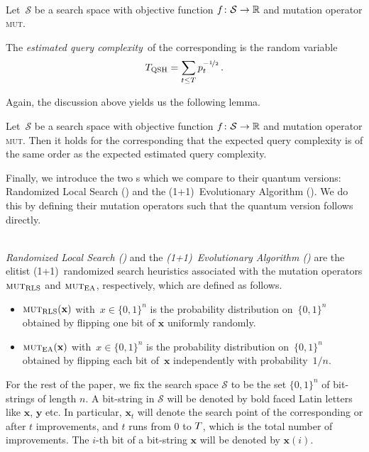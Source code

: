 \begin{definition}[$\TQSH$]~\\
Let~$\mathcal{S}$ be a search space with objective function $f\colon \mathcal{S}\to\mathbb{R}$ and mutation operator \textsc{mut}.

The \emph{estimated query complexity}~\TQSH of the corresponding \qrsh is the random variable
\[
T_{\mathrm{QSH}}=\sum_{t\le T}p_t^{-\nicefrac{1}{2}}\,.
\]
\end{definition}

Again, the discussion above yields us the following lemma.

\begin{lemma}
\label{lem:tq}
Let~$\mathcal{S}$ be a search space with objective function $f\colon \mathcal{S}\to\mathbb{R}$ and mutation operator \textsc{mut}. Then it holds for the corresponding \qrsh that the expected query complexity is of the same order as the expected estimated query complexity.
\end{lemma}

Finally, we introduce the two \rsh{}s which we compare to their quantum versions: Randomized Local Search (\rls) and the (1+1)~Evolutionary Algorithm (\ea). We do this by defining their mutation operators such that the quantum version follows directly.

\begin{definition}~\\
\emph{Randomized Local Search (\rls)} and the \emph{(1+1)~Evolutionary Algorithm (\ea)} are the elitist (1+1)~randomized search heuristics associated with the mutation operators $\textsc{mut}_\mathrm{RLS}$ and $\textsc{mut}_\mathrm{EA}$, respectively, which are defined as follows.
 \begin{itemize}
 \item $\textsc{mut}_{\mathrm{RLS}}(\mathbf{x})$ with~$x\in\{0,1\}^n$ is the probability distribution on~$\{0,1\}^n$ obtained by flipping one bit of $\mathbf{x}$ uniformly randomly.
 \item $\textsc{mut}_{\mathrm{EA}}(\mathbf{x})$ with~$x\in\{0,1\}^n$  is the probability distribution on~$\{0,1\}^n$ obtained by flipping each bit of~$\mathbf{x}$ independently with probability~$1/n$.
 \end{itemize}
\end{definition}

For the rest of the paper, we fix the search space $\mathcal{S}$ to be
the set $\{0,1\}^n$ of bit-strings of length $n$. A bit-string in
$\mathcal{S}$ will be denoted by bold faced Latin letters like
$\mathbf{x}$, $\mathbf{y}$ etc. In particular, $\mathbf{x}_t$ will denote the search point of the corresponding \rsh or \qrsh after $t$ improvements, and $t$ runs from $0$ to $T$, which is the total number of improvements. The $i$-th bit of a bit-string
$\mathbf{x}$ will be denoted by $\mathbf{x}(i)$. 

